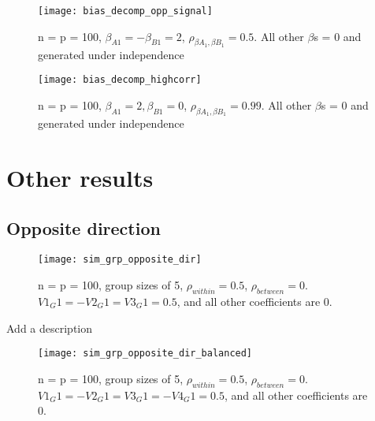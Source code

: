 \begin{figure}[hbtp]
    \begin{center}
    \texttt{[image: bias\_decomp\_opp\_signal]}
    \caption{\label{Fig:bias_decomp_opp_signal} n = p = 100, $\beta_{A1} = -\beta_{B1} = 2$, $\rho_{\beta{A_1},\beta{B_1}} = 0.5$.  All other $\beta$s = 0 and  generated under independence}
    \end{center}
\end{figure}

\begin{figure}[hbtp]
    \begin{center}
    \texttt{[image: bias\_decomp\_highcorr]}
    \caption{\label{Fig:bias_decomp_highcorr} n = p = 100, $\beta_{A1} = 2, \beta_{B1} = 0$, $\rho_{\beta{A_1},\beta{B_1}} = 0.99$.  All other $\beta$s = 0 and  generated under independence}
    \end{center}
\end{figure}

\newpage

\section{Other results}

\subsection{Opposite direction}

\begin{figure}[hbtp]
    \begin{center}
    \texttt{[image: sim\_grp\_opposite\_dir]}
    \caption{\label{Fig:sim_grp_opposite_dir} n = p = 100, group sizes of 5, $\rho_{within} = 0.5$, $\rho_{between} = 0$. $V1_G1 = -V2_G1 = V3_G1 = 0.5$, and all other coefficients are 0.}
    \end{center}
\end{figure}

\begin{table}[hb]
  \centering
  
  \caption{\label{Tab:sim_grp_opposite_dir_selection_freq}Add a description}
\end{table}

\begin{figure}[hbtp]
    \begin{center}
    \texttt{[image: sim\_grp\_opposite\_dir\_balanced]}
    \caption{\label{Fig:sim_grp_opposite_dir_balanced} n = p = 100, group sizes of 5, $\rho_{within} = 0.5$, $\rho_{between} = 0$. $V1_G1 = -V2_G1 = V3_G1 = -V4_G1 = 0.5$, and all other coefficients are 0.}
    \end{center}
\end{figure}

